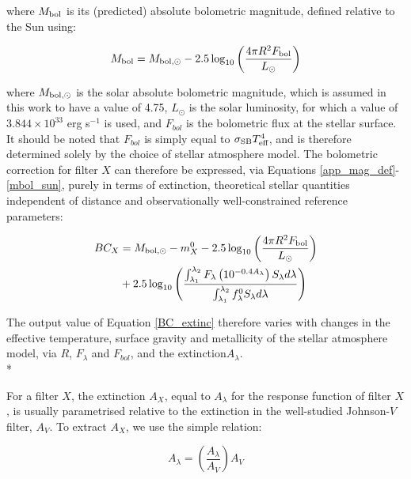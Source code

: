 \documentclass[12pt, a4paper]{report}
\begin{document}
where $M_{\textnormal{bol}}$ is its (predicted) absolute bolometric magnitude, defined relative to the Sun using:

\begin{equation}
M_{\textnormal{bol}} = M_{\textnormal{bol},\odot} - 2.5 \log_{10} \left( \frac{4\pi R^{2}F_{\textnormal{bol}}}{L_{\odot}} \right)
\label{mbol_sun}
\end{equation}

where $M_{\textnormal{bol},\odot}$ is the solar absolute bolometric magnitude, which is assumed in this work to have a value of 4.75, $L_{\odot}$ is the solar luminosity, for which a value of $3.844 \times 10^{33}$ erg s$^{-1}$ is used, and $F_{bol}$ is the bolometric flux at the stellar surface. It should be noted that $F_{bol}$ is simply equal to $\sigma_{\textnormal{SB}} T_{\textnormal{eff}}^{4}$, and is therefore determined solely by the choice of stellar atmosphere model. The bolometric correction for filter $X$ can therefore be expressed, via Equations \ref{app_mag_def}-\ref{mbol_sun}, purely in terms of extinction, theoretical stellar quantities independent of distance and observationally well-constrained reference parameters:

\begin{align}
\begin{split}
BC_{X} &= M_{\textnormal{bol},\odot} - m_{X}^{0} - 2.5 \log_{10} \left( \frac{4\pi R^{2}F_{\textnormal{bol}}}{L_{\odot}} \right) \\
&+ 2.5 \log_{10} \left( \frac{\int_{\lambda_{1}}^{\lambda_{2}} F_{\lambda} \left( 10^{-0.4 A_{\lambda}} \right) S_{\lambda} d\lambda}{\int_{\lambda_{1}}^{\lambda_{2}} f_{\lambda}^{0} S_{\lambda} d\lambda} \right)
\label{BC_extinc}
\end{split}
\end{align}

The output value of Equation \ref{BC_extinc} therefore varies with changes in the effective temperature, surface gravity and metallicity of the stellar atmosphere model, via $R$, $F_{\lambda}$ and $F_{bol}$, and the extinction$ A_{\lambda}$.\\*

For a filter $X$, the extinction $A_{X}$, equal to $A_{\lambda}$ for the response function of filter $X$, is usually parametrised relative to the extinction in the well-studied Johnson-$V$ filter, $A_{V}$. To extract $A_{X}$, we use the simple relation:

\begin{equation}
A_{\lambda} = \left( \frac{A_{\lambda}}{A_{V}} \right) A_{V}
\label{ratio_eq}
\end{equation}
\end{document}
